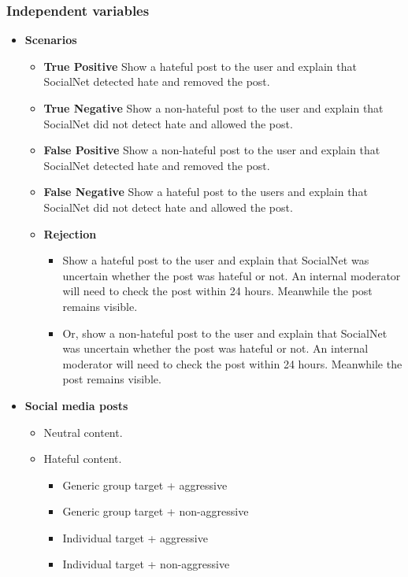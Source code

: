 \documentclass[a4paper]{article}
\begin{document}
\subsubsection{Independent variables}
\begin{itemize}
    \item \textbf{Scenarios}
          \begin{itemize}
              \item \textbf{True Positive} Show a hateful post to the user and explain that SocialNet detected hate and removed the post.
              \item \textbf{True Negative} Show a non-hateful post to the user and explain that SocialNet did not detect hate and allowed the post.
              \item \textbf{False Positive} Show a non-hateful post to the user and explain that SocialNet detected hate and removed the post.
              \item \textbf{False Negative} Show a hateful post to the users and explain that SocialNet did not detect hate and allowed the post.
              \item \textbf{Rejection}
                    \begin{itemize}
                        \item Show a hateful post to the user and explain that SocialNet was uncertain whether the post was hateful or not. An internal moderator will need to check the post within 24 hours. Meanwhile the post remains visible.
                        \item Or, show a non-hateful post to the user and explain that SocialNet was uncertain whether the post was hateful or not. An internal moderator will need to check the post within 24 hours. Meanwhile the post remains visible.
                    \end{itemize}
          \end{itemize}

    \item \textbf{Social media posts}
          \begin{itemize}
              \item Neutral content.
              \item Hateful content.\begin{itemize}
                        \item Generic group target + aggressive
                        \item Generic group target + non-aggressive
                        \item Individual target + aggressive
                        \item Individual target + non-aggressive
                    \end{itemize}
          \end{itemize}
\end{itemize}
\end{document}
